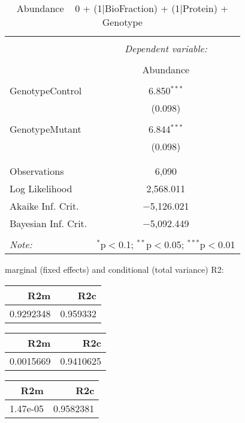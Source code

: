 \documentclass[11pt]{report}
\begin{document}
\begin{table}[!htbp] \centering 
  \caption{Abundance ~ 0 + (1|BioFraction) + (1|Protein) + Genotype} 
  \label{} 
\begin{tabular}{@{\extracolsep{5pt}}lc} 
\\[-1.8ex]\hline 
\hline \\[-1.8ex] 
 & \multicolumn{1}{c}{\textit{Dependent variable:}} \\ 
\cline{2-2} 
\\[-1.8ex] & Abundance \\ 
\hline \\[-1.8ex] 
 GenotypeControl & 6.850$^{***}$ \\ 
  & (0.098) \\ 
  & \\ 
 GenotypeMutant & 6.844$^{***}$ \\ 
  & (0.098) \\ 
  & \\ 
\hline \\[-1.8ex] 
Observations & 6,090 \\ 
Log Likelihood & 2,568.011 \\ 
Akaike Inf. Crit. & $-$5,126.021 \\ 
Bayesian Inf. Crit. & $-$5,092.449 \\ 
\hline 
\hline \\[-1.8ex] 
\textit{Note:}  & \multicolumn{1}{r}{$^{*}$p$<$0.1; $^{**}$p$<$0.05; $^{***}$p$<$0.01} \\ 
\end{tabular} 
\end{table} 
marginal (fixed effects) and conditional (total variance) R2:

\begin{tabular}{r|r}
\hline
R2m & R2c\\
\hline
0.9292348 & 0.959332\\
\hline
\end{tabular}

\begin{tabular}{r|r}
\hline
R2m & R2c\\
\hline
0.0015669 & 0.9410625\\
\hline
\end{tabular}

\begin{tabular}{r|r}
\hline
R2m & R2c\\
\hline
1.47e-05 & 0.9582381\\
\hline
\end{tabular}
\end{document}
